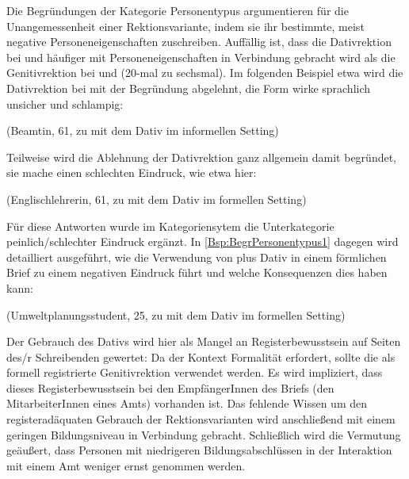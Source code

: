 Die Begründungen der Kategorie \glqq Personentypus\grqq{} argumentieren für die Unangemessenheit einer Rektionsvariante, indem sie ihr bestimmte, meist negative Personeneigenschaften zuschreiben. 
Auffällig ist, dass die Dativrektion bei \wegen{} und \waehrend{} häufiger mit Personeneigenschaften in Verbindung gebracht wird als die Genitivrektion bei \dank{} und \gegenueber{} (20-mal zu sechsmal).
Im folgenden Beispiel etwa wird die Dativrektion bei \waehrend{} mit der Begründung abgelehnt, die Form wirke sprachlich unsicher und schlampig:
\begin{exe}
\ex {} (Beamtin, 61, zu \waehrend{} mit dem Dativ im informellen Setting)
\end{exe}
Teilweise wird die Ablehnung der Dativrektion ganz allgemein damit begründet, sie mache einen schlechten Eindruck, wie etwa hier:
\begin{exe}
\ex {} (Englischlehrerin, 61, zu \wegen{} mit dem Dativ im formellen Setting)
\end{exe}
Für diese Antworten wurde im Kategoriensytem die Unterkategorie \glqq peinlich/schlechter Eindruck\grqq{} ergänzt. 
In \autoref{Bsp:BegrPersonentypus1} dagegen wird detailliert ausgeführt, wie die Verwendung von \waehrend{} plus Dativ in einem förmlichen Brief zu einem negativen Eindruck führt und welche Konsequenzen dies haben kann:
\begin{exe}
\ex {} (Umweltplanungsstudent, 25, zu \waehrend{} mit dem Dativ im formellen Setting) \label{Bsp:BegrPersonentypus1}
\end{exe}
Der Gebrauch des Dativs wird hier als Mangel an Registerbewusstsein auf Seiten des/r Schreibenden gewertet: 
Da der Kontext Formalität erfordert, sollte die als formell registrierte Genitivrektion verwendet werden. 
Es wird impliziert, dass dieses Registerbewusstsein bei den EmpfängerInnen des Briefs (den MitarbeiterInnen eines Amts) vorhanden ist. 
Das fehlende Wissen um den registeradäquaten Gebrauch der Rektionsvarianten wird anschließend mit einem geringen Bildungsniveau in Verbindung gebracht. 
Schließlich wird die Vermutung geäußert, dass Personen mit niedrigeren Bildungsabschlüssen in der Interaktion mit einem Amt weniger ernst genommen werden. 

